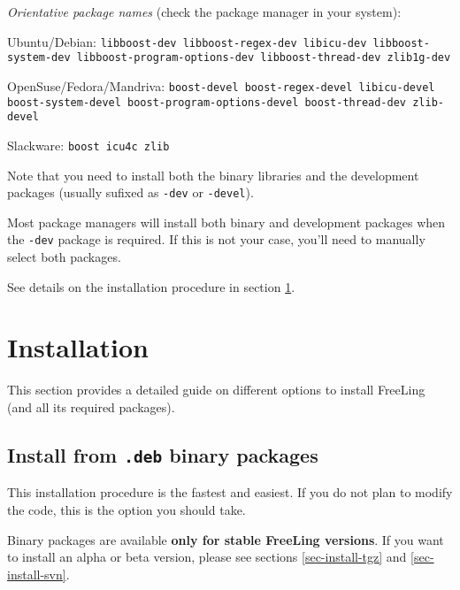 \documentclass[a4paper]{book}
\begin{document}
\begin{list}{}{\leftmargin=1em}
       {\sl Orientative package names} (check the package manager in 
      your system):
      \begin{list}{}{\leftmargin=1em}
       \itemsep 0cm
       \item Ubuntu/Debian: {\tt libboost-dev libboost-regex-dev libicu-dev libboost-system-dev libboost-program-options-dev libboost-thread-dev zlib1g-dev}
       \item OpenSuse/Fedora/Mandriva: {\tt boost-devel boost-regex-devel libicu-devel boost-system-devel boost-program-options-devel boost-thread-dev zlib-devel}
       \item Slackware: {\tt boost icu4c zlib}
       \end{list}

      Note that you need to install both the binary libraries and the
      development packages (usually sufixed as \texttt{-dev} or
      \texttt{-devel}).

      Most package managers will install both binary and development
      packages when the \texttt{-dev} package is required.  If this is
      not your case, you'll need to manually select both packages.

\end{list}

   See details on the installation procedure in section \ref{sec-installation}.

\section{Installation}
\label{sec-installation}

This section provides a detailed guide on different options to install
FreeLing (and all its required packages).

\subsection{Install from {\tt .deb} binary packages}
\label{sec-install-deb}

This installation procedure is the fastest and easiest. 
If you do not plan to modify the code, this is the option you should take.

Binary packages are available {\bf only for stable FreeLing versions}. 
If you want to install an alpha or beta version, please see sections
\ref{sec-install-tgz} and \ref{sec-install-svn}.
                        
\end{document}
